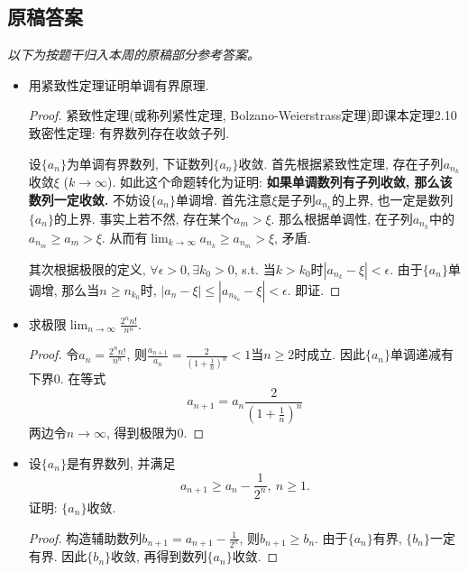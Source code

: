 \documentclass[UTF8,11pt, a4paper, oneside, fontset=none]{ctexbook}
\begin{document}
\clearpage

\subsection*{原稿答案}

\noindent\emph{以下为按题干归入本周的原稿部分参考答案。}

\begin{itemize}
\item[2.] 用紧致性定理证明单调有界原理.


\begin{proof}
紧致性定理(或称列紧性定理, Bolzano-Weierstrass定理)即课本定理2.10致密性定理: 有界数列存在收敛子列. 


设$\{a_n \}$为单调有界数列, 下证数列$\{a_n\}$收敛. 首先根据紧致性定理, 存在子列$a_{n_k}$收敛$\xi$ ($k \to \infty$). 如此这个命题转化为证明: {\bf 如果单调数列有子列收敛, 那么该数列一定收敛.} 不妨设$\{a_n \}$单调增. 首先注意$\xi$是子列$a_{n_k}$的上界, 也一定是数列$\{a_n\}$的上界. 事实上若不然, 存在某个$a_m > \xi$. 那么根据单调性,  在子列$a_{n_k}$中的$a_{n_m} \geq a_m > \xi$. 从而有$\lim_{k \to \infty}a_{n_k} \geq a_{n_m} > \xi$, 矛盾.

其次根据极限的定义, $\forall \epsilon>0, \exists k_0 >0$, s.t. 当$k > k_0$时$|a_{n_k} - \xi| < \epsilon$. 由于$\{a_n \}$单调增, 那么当$n \geq n_{k_0}$时, $|a_n - \xi| \leq |a_{n_{k_0}} - \xi|<\epsilon$. 即证.

\end{proof}


\item[3.] 求极限$\lim_{n \to \infty} \frac{2^n n!}{n^n}$.


\begin{proof}
令$a_n = \frac{2^n n!}{n^n}$, 则$\frac{a_{n+1}}{a_n} = \frac{2}{(1+\frac{1}{n})^n} <1$当$n \geq 2$时成立. 因此$\{a_n\}$单调递减有下界0. 在等式
\[
a_{n+1} = a_n \frac{2}{(1+\frac{1}{n})^n}
\]
两边令$n \to \infty$, 得到极限为0.
\end{proof}

\item[4.] 设$\{a_n\}$是有界数列, 并满足
\[
a_{n+1} \geq a_n - \frac{1}{2^n}, \ n \geq 1.
\]
证明: $\{a_n\}$收敛.

\begin{proof}

构造辅助数列$b_{n+1} = a_{n+1} - \frac{1}{2^n}$, 则$b_{n+1} \geq b_n$. 由于$\{a_n\}$有界, $\{b_n\}$一定有界. 因此$\{ b_n\}$收敛, 再得到数列$\{a_n\}$收敛.


\end{proof}



\end{itemize}
\end{document}

